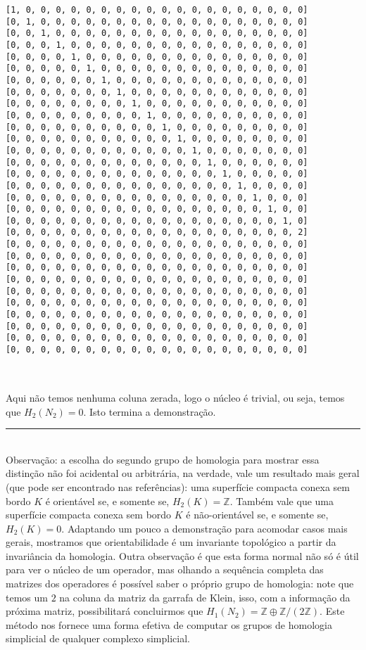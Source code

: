 \documentclass[12pt,a4paper]{article}
\def\eop{\hfill\rule{2.5mm}{2.5mm} \\ }
\theoremstyle{definition}
\begin{document}
\begin{lstlisting}[language=iPython]
[1, 0, 0, 0, 0, 0, 0, 0, 0, 0, 0, 0, 0, 0, 0, 0, 0, 0, 0, 0]
[0, 1, 0, 0, 0, 0, 0, 0, 0, 0, 0, 0, 0, 0, 0, 0, 0, 0, 0, 0]
[0, 0, 1, 0, 0, 0, 0, 0, 0, 0, 0, 0, 0, 0, 0, 0, 0, 0, 0, 0]
[0, 0, 0, 1, 0, 0, 0, 0, 0, 0, 0, 0, 0, 0, 0, 0, 0, 0, 0, 0]
[0, 0, 0, 0, 1, 0, 0, 0, 0, 0, 0, 0, 0, 0, 0, 0, 0, 0, 0, 0]
[0, 0, 0, 0, 0, 1, 0, 0, 0, 0, 0, 0, 0, 0, 0, 0, 0, 0, 0, 0]
[0, 0, 0, 0, 0, 0, 1, 0, 0, 0, 0, 0, 0, 0, 0, 0, 0, 0, 0, 0]
[0, 0, 0, 0, 0, 0, 0, 1, 0, 0, 0, 0, 0, 0, 0, 0, 0, 0, 0, 0]
[0, 0, 0, 0, 0, 0, 0, 0, 1, 0, 0, 0, 0, 0, 0, 0, 0, 0, 0, 0]
[0, 0, 0, 0, 0, 0, 0, 0, 0, 1, 0, 0, 0, 0, 0, 0, 0, 0, 0, 0]
[0, 0, 0, 0, 0, 0, 0, 0, 0, 0, 1, 0, 0, 0, 0, 0, 0, 0, 0, 0]
[0, 0, 0, 0, 0, 0, 0, 0, 0, 0, 0, 1, 0, 0, 0, 0, 0, 0, 0, 0]
[0, 0, 0, 0, 0, 0, 0, 0, 0, 0, 0, 0, 1, 0, 0, 0, 0, 0, 0, 0]
[0, 0, 0, 0, 0, 0, 0, 0, 0, 0, 0, 0, 0, 1, 0, 0, 0, 0, 0, 0]
[0, 0, 0, 0, 0, 0, 0, 0, 0, 0, 0, 0, 0, 0, 1, 0, 0, 0, 0, 0]
[0, 0, 0, 0, 0, 0, 0, 0, 0, 0, 0, 0, 0, 0, 0, 1, 0, 0, 0, 0]
[0, 0, 0, 0, 0, 0, 0, 0, 0, 0, 0, 0, 0, 0, 0, 0, 1, 0, 0, 0]
[0, 0, 0, 0, 0, 0, 0, 0, 0, 0, 0, 0, 0, 0, 0, 0, 0, 1, 0, 0]
[0, 0, 0, 0, 0, 0, 0, 0, 0, 0, 0, 0, 0, 0, 0, 0, 0, 0, 1, 0]
[0, 0, 0, 0, 0, 0, 0, 0, 0, 0, 0, 0, 0, 0, 0, 0, 0, 0, 0, 2]
[0, 0, 0, 0, 0, 0, 0, 0, 0, 0, 0, 0, 0, 0, 0, 0, 0, 0, 0, 0]
[0, 0, 0, 0, 0, 0, 0, 0, 0, 0, 0, 0, 0, 0, 0, 0, 0, 0, 0, 0]
[0, 0, 0, 0, 0, 0, 0, 0, 0, 0, 0, 0, 0, 0, 0, 0, 0, 0, 0, 0]
[0, 0, 0, 0, 0, 0, 0, 0, 0, 0, 0, 0, 0, 0, 0, 0, 0, 0, 0, 0]
[0, 0, 0, 0, 0, 0, 0, 0, 0, 0, 0, 0, 0, 0, 0, 0, 0, 0, 0, 0]
[0, 0, 0, 0, 0, 0, 0, 0, 0, 0, 0, 0, 0, 0, 0, 0, 0, 0, 0, 0]
[0, 0, 0, 0, 0, 0, 0, 0, 0, 0, 0, 0, 0, 0, 0, 0, 0, 0, 0, 0]
[0, 0, 0, 0, 0, 0, 0, 0, 0, 0, 0, 0, 0, 0, 0, 0, 0, 0, 0, 0]
[0, 0, 0, 0, 0, 0, 0, 0, 0, 0, 0, 0, 0, 0, 0, 0, 0, 0, 0, 0]
[0, 0, 0, 0, 0, 0, 0, 0, 0, 0, 0, 0, 0, 0, 0, 0, 0, 0, 0, 0]
 
\end{lstlisting}\ \\

Aqui não temos nenhuma coluna zerada, logo o núcleo é trivial, ou seja, temos que $H_2(N_{2})=0$. Isto termina a demonstração. \eop

Observação: a escolha do segundo grupo de homologia para mostrar essa distinção não foi acidental ou arbitrária, na verdade, vale um resultado mais geral (que pode ser encontrado nas referências): uma superfície compacta conexa sem bordo $K$ é orientável se, e somente se, $H_2(K)=\mathbb{Z}$. Também vale que uma superfície compacta conexa sem bordo $K$ é não-orientável se, e somente se, $H_2(K)=0$. Adaptando um pouco a demonstração para acomodar casos mais gerais, mostramos que orientabilidade é um invariante topológico a partir da invariância da homologia. Outra observação é que esta forma normal não só é útil para ver o núcleo de um operador, mas olhando a sequência completa das matrizes dos operadores é possível saber o próprio grupo de homologia: note que temos um $2$ na coluna da matriz da garrafa de Klein, isso, com a informação da próxima matriz, possibilitará concluirmos que $H_1(N_2)=\mathbb{Z}\oplus\mathbb{Z} / (2 \mathbb{Z})$. Este método nos fornece uma forma efetiva de computar os grupos de homologia simplicial de qualquer complexo simplicial.
\end{document}
